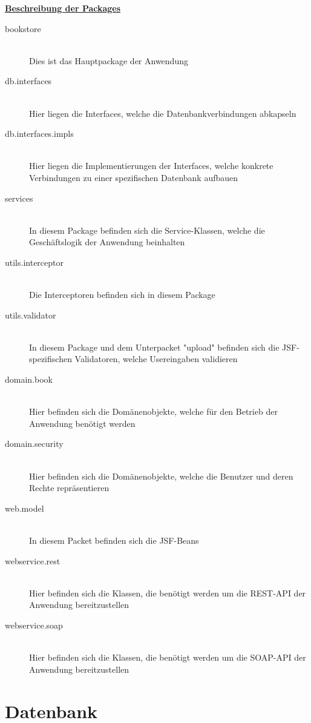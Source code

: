 \documentclass[12pt,a4paper]{book}
\begin{document}
	\underline{\textbf{Beschreibung der Packages}}
		\begin{description}
			\item[bookstore] \hfill \\
			 Dies ist das Hauptpackage der Anwendung
			 	\item[db.interfaces] \hfill \\
				 	Hier liegen die Interfaces, welche die Datenbankverbindungen abkapseln
			 		\item[db.interfaces.impls] \hfill \\
			 		Hier liegen die Implementierungen der Interfaces, welche konkrete Verbindungen zu einer spezifischen Datenbank aufbauen
			 	\item[services] \hfill \\
			 	In diesem Package befinden sich die Service-Klassen, welche die Geschäftslogik der Anwendung beinhalten
		\item[utils.interceptor] \hfill \\
		Die Interceptoren befinden sich in diesem Package
		\item[utils.validator] \hfill \\
		In diesem Package und dem Unterpacket "upload" befinden sich die JSF-spezifischen Validatoren, welche Usereingaben validieren
		\item[domain.book] \hfill \\
		Hier befinden sich die Domänenobjekte, welche für den Betrieb der Anwendung benötigt werden 
		\item[domain.security] \hfill \\
		Hier befinden sich die Domänenobjekte, welche die Benutzer und deren Rechte repräsentieren
		\item[web.model] \hfill \\
		In diesem Packet befinden sich die JSF-Beans
		\item[webservice.rest] \hfill \\
		Hier befinden sich die Klassen, die benötigt werden um die REST-API der Anwendung bereitzustellen
		\item[webservice.soap] \hfill \\
		Hier befinden sich die Klassen, die benötigt werden um die SOAP-API der Anwendung bereitzustellen
		\end{description}
		
		\chapter{Datenbank}
		\vspace{1cm}
		
\end{document}
